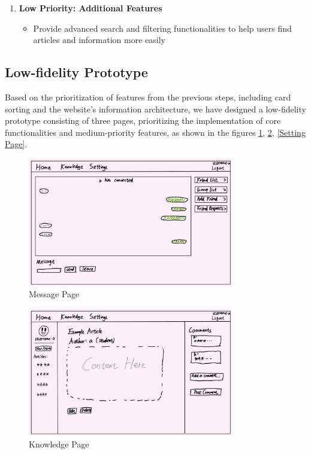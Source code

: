 \documentclass[12pt]{article}
\begin{document}
\begin{enumerate}
    \item \textbf{Low Priority: Additional Features}
        \begin{itemize}

            \item Provide advanced search and filtering functionalities to help users find articles and information more easily
        \end{itemize}


    \end{enumerate}

\subsection{Low-fidelity Prototype}
    \hspace{2em}Based on the prioritization of features from the previous steps, including card sorting and the website's information architecture, we have designed a low-fidelity prototype consisting of three pages, prioritizing the implementation of core functionalities and medium-priority features, as shown in the figures \ref{Message Page}, \ref{Knowledge Page}, \ref{Setting Page}.
            
    \begin{figure}[H]
        \centering
        \includegraphics[width=0.8\textwidth]{graphs/message_page.jpg}
        \caption{Message Page}
        \label{Message Page}
    \end{figure}

    \begin{figure}[H]
        \centering
        \includegraphics[width=0.8\textwidth]{graphs/knowledge_page.jpg}
        \caption{Knowledge Page}
        \label{Knowledge Page}
    \end{figure}
\end{document}

